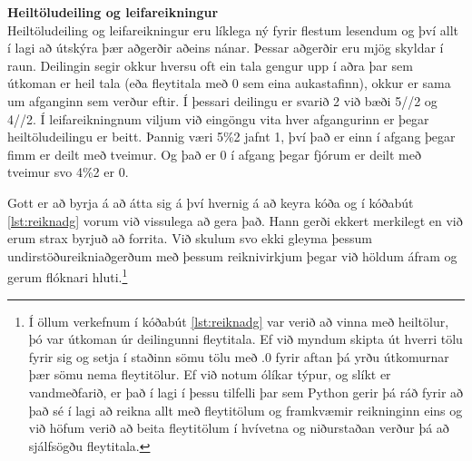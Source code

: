 \begin{itarefni}
\textbf{Heiltöludeiling og leifareikningur}\\
	Heiltöludeiling og leifareikningur eru líklega ný fyrir flestum lesendum og því allt í lagi að útskýra þær aðgerðir aðeins nánar.
	Þessar aðgerðir eru mjög skyldar í raun.
	Deilingin segir okkur hversu oft ein tala gengur upp í aðra þar sem útkoman er heil tala (eða fleytitala með 0 sem eina aukastafinn), okkur er sama um afganginn sem verður eftir.
	Í þessari deilingu er svarið 2 við bæði 5//2 og 4//2.
	Í leifareikningnum viljum við eingöngu vita hver afgangurinn er þegar heiltöludeilingu er beitt.
	Þannig væri 5\%2 jafnt 1, því það er einn í afgang þegar fimm er deilt með tveimur.
	Og það er 0 í afgang þegar fjórum er deilt með tveimur svo 4\%2 er 0.
\end{itarefni}

Gott er að byrja á að átta sig á því hvernig á að keyra kóða og í kóðabút \ref{lst:reiknadg} vorum við vissulega að gera það.
Hann gerði ekkert merkilegt en við erum strax byrjuð að forrita.
Við skulum svo ekki gleyma þessum undirstöðureikniaðgerðum með þessum reiknivirkjum þegar við höldum áfram og gerum flóknari hluti.\footnote{
	Í öllum verkefnum í kóðabút \ref{lst:reiknadg} var verið að vinna með heiltölur, þó var útkoman úr deilingunni fleytitala. 
	Ef við myndum skipta út hverri tölu fyrir sig og setja í staðinn sömu tölu með .0 fyrir aftan þá yrðu útkomurnar þær sömu nema fleytitölur. 
	Ef við notum ólíkar týpur, og slíkt er vandmeðfarið, er það í lagi í þessu tilfelli þar sem Python gerir þá ráð fyrir að það sé í lagi að reikna allt með fleytitölum og framkvæmir reikninginn eins og við höfum verið að beita fleytitölum í hvívetna og niðurstaðan verður þá að sjálfsögðu fleytitala.
}

